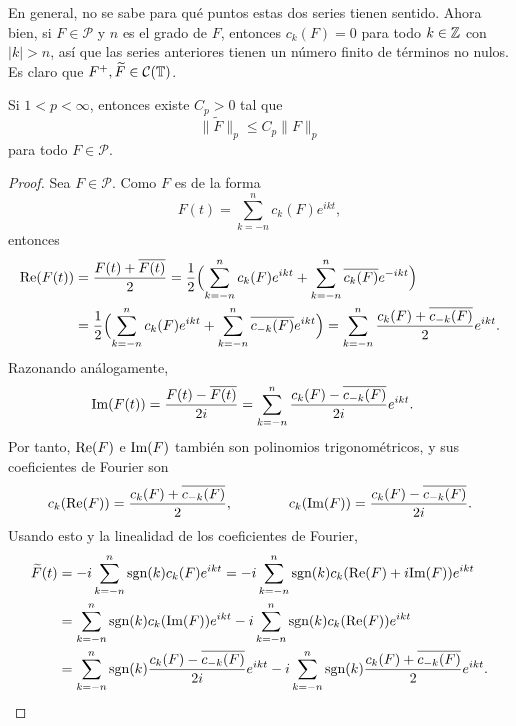 \documentclass[a4paper, 12pt, oneside]{book}
\begin{document}
En general, no se sabe para qué puntos estas dos series tienen sentido. Ahora bien, si $F \in \mathcal{P}$ y $n$ es el grado de $F$, entonces $c_k(F) = 0$ para todo $k\in\mathbb Z$ con $|k|>n$, así que las series anteriores tienen un número finito de términos no nulos. Es claro que $F^+, \widetilde{F}\in \mathcal{C}(\mathbb T)$.

\begin{lemma}
    Si $1 < p < \infty$, entonces existe $C_p > 0$ tal que
    \[\|\widetilde{F}\|_p \leq C_p \|F\|_{p}\]
    para todo $F \in \mathcal{P}$.
\end{lemma}

\begin{proof}
    Sea $F \in \mathcal{P}$. Como $F$ es de la forma
    \[F(t) = \sum_{k=-n}^n c_k(F)e^{ikt},\]
    entonces
    \begin{align*}
        \textup{Re}(F(t)) &= \frac{F(t)+\overline{F(t)}}{2} = \frac{1}{2}\Bigl(\sum_{k=-n}^n c_k(F)e^{ikt}+\sum_{k=-n}^n\overline{c_k(F)}e^{-ikt}\Bigr) \\
        &= \frac{1}{2}\Bigl(\sum_{k=-n}^n c_k(F)e^{ikt}+\sum_{k=-n}^n\overline{c_{-k}(F)}e^{ikt}\Bigr) = \sum_{k=-n}^n \frac{c_k(F)+\overline{c_{-k}(F)}}{2}e^{ikt}.
    \end{align*}
    Razonando análogamente,
    \begin{align*}
        \textup{Im}(F(t)) &= \frac{F(t)-\overline{F(t)}}{2i} = \sum_{k=-n}^n \frac{c_k(F)-\overline{c_{-k}(F)}}{2i}e^{ikt}.
    \end{align*}
    Por tanto, $\textup{Re}(F)$ e $\textup{Im}(F)$ también son polinomios trigonométricos, y sus coeficientes de Fourier son
    \[c_k(\textup{Re}(F)) = \frac{c_k(F)+\overline{c_{-k}(F)}}{2}, \qquad \qquad c_k(\textup{Im}(F)) = \frac{c_k(F)-\overline{c_{-k}(F)}}{2i}.\]
    Usando esto y la linealidad de los coeficientes de Fourier,
    \begin{equation}\label{3.2.3}
    \begin{aligned}[b]
        \widetilde{F}(t) &= -i\sum_{k=-n}^n \textup{sgn}(k)c_k(F)e^{ikt} = -i\sum_{k=-n}^n \textup{sgn}(k)c_k(\textup{Re}(F)+i\textup{Im}(F))e^{ikt} \\
        &= \sum_{k=-n}^n \textup{sgn}(k)c_k(\textup{Im}(F))e^{ikt} -i\sum_{k=-n}^n \textup{sgn}(k)c_k(\textup{Re}(F))e^{ikt} \\
        &=  \sum_{k=-n}^n \textup{sgn}(k)\frac{c_k(F)-\overline{c_{-k}(F)}}{2i}e^{ikt} -i\sum_{k=-n}^n \textup{sgn}(k)\frac{c_k(F)+\overline{c_{-k}(F)}}{2}e^{ikt}.
     \end{aligned}
    \end{equation}
    

\end{proof}
\end{document}
